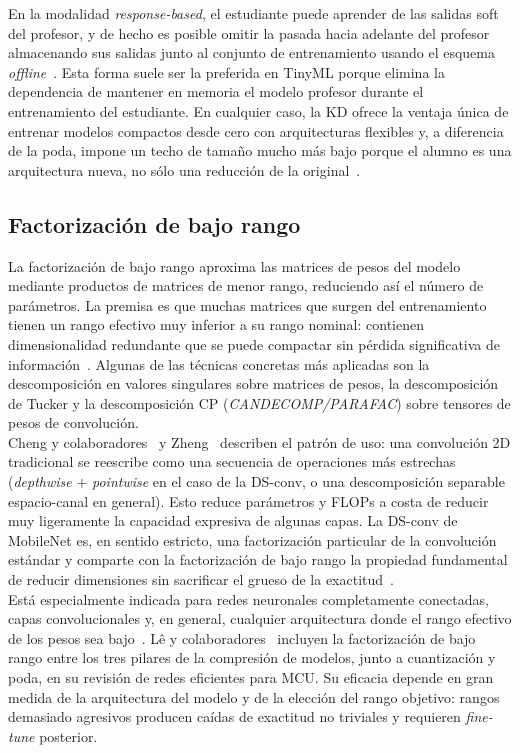 \documentclass[a4paper,12pt,twoside,final]{book}
\begin{document}
En la modalidad \textit{response-based}, el estudiante puede aprender de las salidas soft del profesor, y de hecho es
posible omitir la pasada hacia adelante del profesor almacenando sus salidas junto al conjunto de entrenamiento
usando el esquema \textit{offline}~\cite{gou2021ijcv,xu2023ieecomst}. Esta forma suele ser la preferida en
TinyML porque elimina la dependencia de mantener en memoria el modelo profesor durante el entrenamiento del
estudiante. En cualquier caso, la KD ofrece la ventaja única de entrenar modelos compactos desde cero con
arquitecturas flexibles y, a diferencia de la poda, impone un techo de tamaño mucho más bajo porque el alumno es una
arquitectura nueva, no sólo una reducción de la original~\cite{gou2021ijcv}.

\subsection{Factorización de bajo rango}
La factorización de bajo rango aproxima las matrices de pesos del modelo mediante productos de matrices de menor
rango, reduciendo así el número de parámetros. La premisa es que muchas matrices que surgen del entrenamiento tienen
un rango efectivo muy inferior a su rango nominal: contienen dimensionalidad redundante que se puede compactar sin
pérdida significativa de información~\cite{cheng2024ieetpami,lê2025tist}. Algunas de las técnicas concretas más
aplicadas son la descomposición en valores singulares sobre matrices de pesos, la descomposición de Tucker y la
descomposición CP (\textit{CANDECOMP/PARAFAC}) sobre tensores de pesos de convolución.\\

Cheng y colaboradores~\cite{cheng2024ieetpami} y Zheng~\cite{zheng2025diffusion} describen el patrón de uso: una
convolución 2D tradicional se reescribe como una secuencia de operaciones más estrechas (\textit{depthwise} $+$
\textit{pointwise} en el caso de la DS-conv, o una descomposición separable espacio-canal en general). Esto reduce
parámetros y FLOPs a costa de reducir muy ligeramente la capacidad expresiva de algunas capas. La DS-conv de
MobileNet es, en sentido estricto, una factorización particular de la convolución estándar y comparte con la
factorización de bajo rango la propiedad fundamental de reducir dimensiones sin sacrificar el grueso de la
exactitud~\cite{lê2025tist,zheng2025diffusion}.\\

Está especialmente indicada para redes neuronales completamente conectadas, capas convolucionales y, en general,
cualquier arquitectura donde el rango efectivo de los pesos sea bajo~\cite{lê2025tist}. Lê y
colaboradores~\cite{lê2025tist} incluyen la factorización de bajo rango entre los tres pilares de la compresión de
modelos, junto a cuantización y poda, en su revisión de redes eficientes para MCU. Su eficacia depende en
gran medida de la arquitectura del modelo y de la elección del rango objetivo: rangos demasiado agresivos producen
caídas de exactitud no triviales y requieren \textit{fine-tune} posterior.
\end{document}
